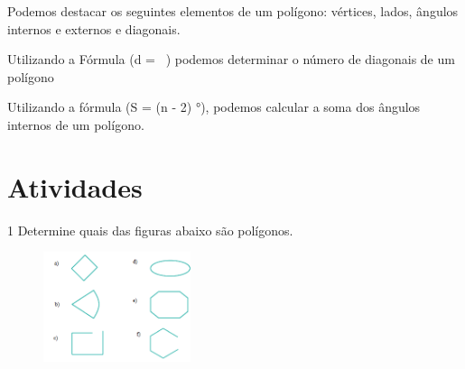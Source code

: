 Podemos destacar os seguintes elementos de um polígono: vértices, lados,
ângulos internos e externos e diagonais.

Utilizando a Fórmula (d = \ ) podemos determinar o
número de diagonais de um polígono

Utilizando a fórmula (S = (n - 2) °), podemos calcular a
soma dos ângulos internos de um polígono.

\section{Atividades}





\num{1} Determine quais das figuras abaixo são polígonos.

\begin{figure}[H]
\centering\includegraphics[width=1.7in,height=1.26763in]{./imgSAEB_8_MAT/media/image7.png}
\end{figure}

